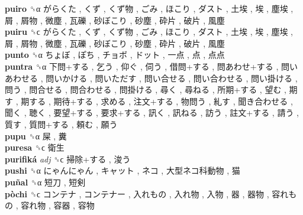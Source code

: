 \textbf{puiro} ␝α   がらくた ,  くず ,  くず物 ,  ごみ ,  ほこり ,  ダスト ,  土埃 ,  埃 ,  塵埃 ,  屑 ,  屑物 ,  微塵 ,  瓦礫 ,  砂ぼこり ,  砂塵 ,  砕片 ,  破片 ,  風塵   \\
\textbf{puiru} ␝ϲ   がらくた ,  くず ,  くず物 ,  ごみ ,  ほこり ,  ダスト ,  土埃 ,  埃 ,  塵埃 ,  屑 ,  屑物 ,  微塵 ,  瓦礫 ,  砂ぼこり ,  砂塵 ,  砕片 ,  破片 ,  風塵   \\
\textbf{punto} ␝α   ちょぼ ,  ぽち ,  チョボ ,  ドット ,  一点 ,  点 ,  点点   \\
\textbf{puntra} ␝α   下問+する ,  乞う ,  仰ぐ ,  伺う ,  借問+する ,  問あわせ+する ,  問いあわせる ,  問いかける ,  問いただす ,  問い合せる ,  問い合わせる ,  問い掛ける ,  問う ,  問合せる ,  問合わせる ,  問掛ける ,  尋く ,  尋ねる ,  所期+する ,  望む ,  期す ,  期する ,  期待+する ,  求める ,  注文+する ,  物問う ,  糺す ,  聞き合わせる ,  聞く ,  聴く ,  要望+する ,  要求+する ,  訊く ,  訊ねる ,  訪う ,  註文+する ,  請う ,  質す ,  質問+する ,  頼む ,  願う   \\
\textbf{pupu} ␝α   屎 ,  糞   \\
\textbf{puresa} ␝ϲ   衛生   \\
\textbf{purifiká} \emph{adj}  ␝ϲ   掃除+する ,  浚う   \\
\textbf{pushi} ␝α   にゃんにゃん ,  キャット ,  ネコ ,  大型ネコ科動物 ,  猫   \\
\textbf{puñal} ␝α   短刀 ,  短剣   \\
\textbf{pòchi} ␝ϲ   コンテナ ,  コンテナー ,  入れもの ,  入れ物 ,  入物 ,  器 ,  器物 ,  容れもの ,  容れ物 ,  容器 ,  容物   \\
